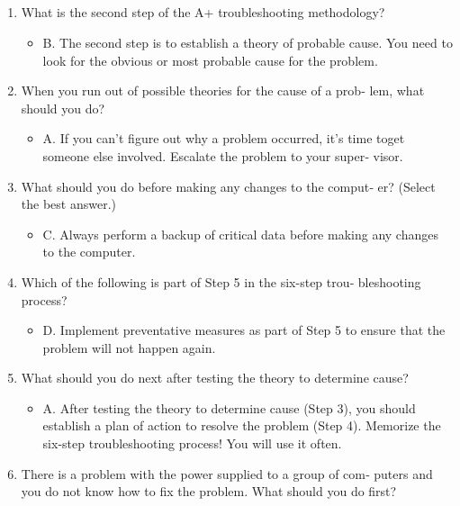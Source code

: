 \documentclass{article}
\begin{document}
\subsection{}
\begin{enumerate}
    \item What is the second step of the A+ troubleshooting methodology?
    \begin{itemize}
        \item B. The second step is to establish a theory of probable cause.
You need to look for the obvious or most probable cause for
the problem.
    \end{itemize}
    \item When you run out of possible theories for the cause of a prob‐
lem, what should you do?
    \begin{itemize}
        \item A. If you can’t figure out why a problem occurred, it’s time toget someone else involved. Escalate the problem to your super‐
visor.
    \end{itemize}
    \item What should you do before making any changes to the comput‐
er? (Select the best answer.)
    \begin{itemize}
        \item C. Always perform a backup of critical data before making any
changes to the computer.
    \end{itemize}
    \item Which of the following is part of Step 5 in the six-step trou‐
bleshooting process?
    \begin{itemize}
        \item D. Implement preventative measures as part of Step 5 to ensure
that the problem will not happen again.
    \end{itemize}
    \item What should you do next after testing the theory to determine
cause?
    \begin{itemize}
        \item A. After testing the theory to determine cause (Step 3), you
should establish a plan of action to resolve the problem (Step
4). Memorize the six-step troubleshooting process! You will
use it often.
    \end{itemize}
    \item There is a problem with the power supplied to a group of com‐
puters and you do not know how to fix the problem. What
should you do first?
    \begin{itemize}

\end{itemize}
\end{enumerate}
\end{document}
